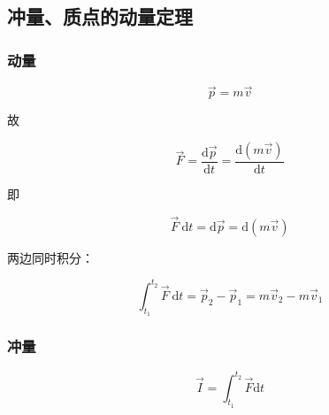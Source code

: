 \documentclass[
	12pt, %
	a4paper, %
]{myLegrandOrangeBook}
\newcommand{\rmd}{\mathrm{d}}
\newcommand{\deriv}[2]{\frac{\rmd #1}{\rmd #2}}
\begin{document}
    \subsection{冲量、质点的动量定理}

    \subsubsection*{动量}

    \vspace{1em}
    \begin{definition}[动量]

        \begin{equation}
            \overrightarrow{p} = m\overrightarrow{v}
        \end{equation}

    \end{definition}

    故

    \begin{equation}
        \overrightarrow{F} = \deriv{\overrightarrow{p}}{t} = \deriv{\left(m\overrightarrow{v}\right)}{t}
    \end{equation}

    即

    $$
        \overrightarrow{F} \mathrm{~d} t=\mathrm{d} \overrightarrow{p}=\mathrm{d}(m \overrightarrow{v})
    $$

    两边同时积分：

    $$
        \int_{t_1}^{t_2} \overrightarrow{F} \mathrm{~d} t=\overrightarrow{p}_2-\overrightarrow{p}_1=
        m \overrightarrow{v}_2-m \overrightarrow{v}_1
    $$

    \subsubsection*{冲量}

    \vspace{1em}
    \begin{definition}[冲量]

        \begin{equation}
            \overrightarrow{I} = \int_{t_1}^{t_2} \overrightarrow{F} \rmd t
        \end{equation}

    \end{definition}
\end{document}
